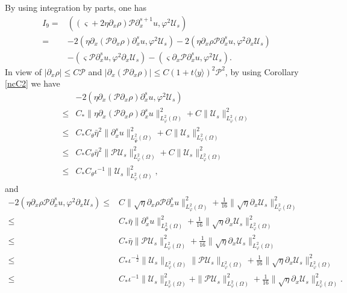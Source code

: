 \documentclass{amsart}
\numberwithin{equation}{section}
\newcommand\y{{{\langle y \rangle}}}
\begin{document}
By using integration by parts, one has
\begin{align}\label{I9}
I_{9}
=&((\varsigma+2\eta\partial_{x}\rho)\mathcal{P}\partial_{x}^{s+1}u,\varphi^{2}\mathcal{U}_{s})\\
=&-2(\eta\partial_{x}(\mathcal{P}\partial_{x}\rho)\partial_{x}^{s}u,\varphi^{2}\mathcal{U}_{s})
  -2(\eta\partial_{x}\rho\mathcal{P}\partial_{x}^{s}u,\varphi^{2}\partial_{x}\mathcal{U}_{s})\nonumber\\
 &-(\varsigma\mathcal{P}\partial_{x}^{s}u,\varphi^{2}\partial_{x}\mathcal{U}_{s})
  -(\varsigma\partial_{x}\mathcal{P}\partial_{x}^{s}u,\varphi^{2}\mathcal{U}_{s}).\nonumber
\end{align}
In view of $\left|\partial_{x}\rho\right|\leq C\mathcal{P}$
and $\left|\partial_{x}(\mathcal{P}\partial_{x}\rho)\right|\leq C(1+t\y)^{2}\mathcal{P}^{2}$,
by using Corollary \ref{ncC2} we have
\begin{align}\label{I91}
&-2(\eta\partial_{x}(\mathcal{P}\partial_{x}\rho)\partial_{x}^{s}u,\varphi^{2}\mathcal{U}_{s})\\
\leq& C_{*}\|\eta\partial_{x}(\mathcal{P}\partial_{x}\rho)\partial_{x}^{s}u\|_{L_{\varphi}^{2}(\Omega)}^{2}
     +C\|\mathcal{U}_{s}\|_{L_{\varphi}^{2}(\Omega)}^{2}\nonumber\\
\leq& C_{*}C_{\theta}\bar{\eta}^{2}\|\partial_{x}^{s}u\|_{L_{\hat{\Psi}}^{2}(\Omega)}^{2}
     +C\|\mathcal{U}_{s}\|_{L_{\varphi}^{2}(\Omega)}^{2}\nonumber\\
\leq& C_{*}C_{\theta}\bar{\eta}^{2}\|\mathcal{P}\mathcal{U}_{s}\|_{L_{\varphi}^{2}(\Omega)}^{2}
     +C\|\mathcal{U}_{s}\|_{L_{\varphi}^{2}(\Omega)}^{2}\nonumber\\
\leq& C_{*}C_{\theta}\iota^{-1}\|\mathcal{U}_{s}\|_{L_{\varphi}^{2}(\Omega)}^{2},\nonumber
\end{align}
and
\begin{align}\label{I92}
-2(\eta\partial_{x}\rho\mathcal{P}\partial_{x}^{s}u,\varphi^{2}\partial_{x}\mathcal{U}_{s})
\leq& C\|\sqrt{\eta}\partial_{x}\rho\mathcal{P}\partial_{x}^{s}u\|_{L_{\varphi}^{2}(\Omega)}^{2}
    +\frac{1}{16}\|\sqrt{\eta}\partial_{x}\mathcal{U}_{s}\|_{L_{\varphi}^{2}(\Omega)}^{2}\\
\leq& C_{*}\bar{\eta}\|\partial_{x}^{s}u\|_{L_{\hat{\Psi}}^{2}(\Omega)}^{2}
     +\frac{1}{16}\|\sqrt{\eta}\partial_{x}\mathcal{U}_{s}\|_{L_{\varphi}^{2}(\Omega)}^{2}\nonumber\\
\leq& C_{*}\bar{\eta}\|\mathcal{P}\mathcal{U}_{s}\|_{L_{\varphi}^{2}(\Omega)}^{2}
     +\frac{1}{16}\|\sqrt{\eta}\partial_{x}\mathcal{U}_{s}\|_{L_{\varphi}^{2}(\Omega)}^{2}\nonumber\\
\leq& C_{*}\iota^{-\frac{1}{2}}\|\mathcal{U}_{s}\|_{L_{\varphi}^{2}(\Omega)}\|\mathcal{P}\mathcal{U}_{s}\|_{L_{\varphi}^{2}(\Omega)}
     +\frac{1}{16}\|\sqrt{\eta}\partial_{x}\mathcal{U}_{s}\|_{L_{\varphi}^{2}(\Omega)}^{2}\nonumber\\
\leq& C_{*}\iota^{-1}\|\mathcal{U}_{s}\|_{L_{\varphi}^{2}(\Omega)}^{2}
     +\|\mathcal{P}\mathcal{U}_{s}\|_{L_{\varphi}^{2}(\Omega)}^{2}
     +\frac{1}{16}\|\sqrt{\eta}\partial_{x}\mathcal{U}_{s}\|_{L_{\varphi}^{2}(\Omega)}^{2}.\nonumber
\end{align}
\end{document}
